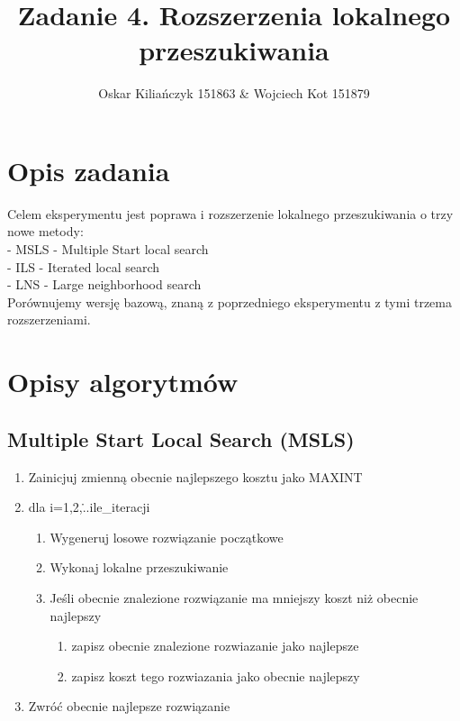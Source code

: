 \documentclass[11pt]{article}
\title{Zadanie 4. Rozszerzenia lokalnego przeszukiwania}
\author{Oskar Kiliańczyk 151863 \& Wojciech Kot 151879}
\date{}
\begin{document}
\maketitle
\newpage

\section{Opis zadania}\label{sec:opis-zadania}

Celem eksperymentu jest poprawa i rozszerzenie lokalnego przeszukiwania o trzy nowe metody:\\
- MSLS - Multiple Start local search\\
- ILS - Iterated local search\\
- LNS - Large neighborhood search\\
Porównujemy wersję bazową, znaną z poprzedniego eksperymentu z tymi trzema rozszerzeniami.\\


\section{Opisy algorytmów}\label{sec:opisy-alg}

\subsection{Multiple Start Local Search (MSLS)}\label{subsec:msls}
\begin{enumerate}
    \item Zainicjuj zmienną obecnie najlepszego kosztu jako MAXINT
    \item dla i=1,2,\...ile\_iteracji
    \begin{enumerate}
        \item Wygeneruj losowe rozwiązanie początkowe
        \item Wykonaj lokalne przeszukiwanie
        \item Jeśli obecnie znalezione rozwiązanie ma mniejszy koszt niż obecnie najlepszy
        \begin{enumerate}
            \item zapisz obecnie znalezione rozwiazanie jako najlepsze
            \item zapisz koszt tego rozwiazania jako obecnie najlepszy
        \end{enumerate}
    \end{enumerate}
    \item Zwróć obecnie najlepsze rozwiązanie
\end{enumerate}
\end{document}
